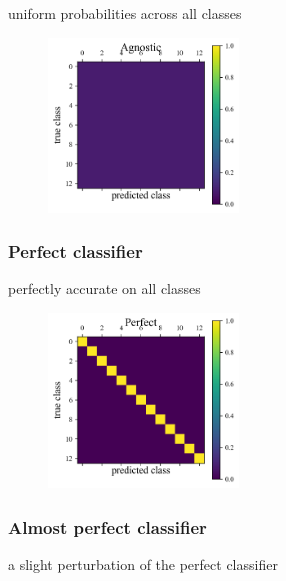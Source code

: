 uniform probabilities across all classes

\begin{figure}
	\begin{center}
		\includegraphics[width=0.45\textwidth]{./fig/Agnostic.png}\\
		\caption{}
		\label{fig:agnostic_data}
	\end{center}
\end{figure}

\subsubsection{Perfect classifier}
\label{sec:perfect_data}

perfectly accurate on all classes

\begin{figure}
	\begin{center}
		\includegraphics[width=0.45\textwidth]{./fig/Perfect.png}\\
		\caption{}
		\label{fig:perfect_data}
	\end{center}
\end{figure}

\subsubsection{Almost perfect classifier}
\label{sec:almost_data}

a slight perturbation of the perfect classifier

